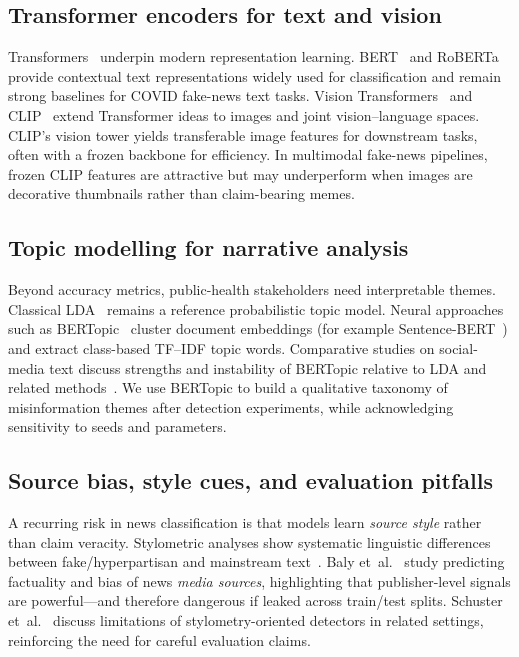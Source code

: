 \documentclass[12pt, a4paper]{report}
\begin{document}
\subsection{Transformer encoders for text and vision}

Transformers~\cite{vaswani2017attention} underpin modern representation learning.
BERT~\cite{devlin2019bert} and RoBERTa~\cite{liu2019roberta} provide contextual text representations widely used for classification and remain strong baselines for COVID fake-news text tasks.
Vision Transformers~\cite{dosovitskiy2021vit} and CLIP~\cite{radford2021clip} extend Transformer ideas to images and joint vision--language spaces.
CLIP's vision tower yields transferable image features for downstream tasks, often with a frozen backbone for efficiency.
In multimodal fake-news pipelines, frozen CLIP features are attractive but may underperform when images are decorative thumbnails rather than claim-bearing memes.

\subsection{Topic modelling for narrative analysis}

Beyond accuracy metrics, public-health stakeholders need interpretable themes.
Classical LDA~\cite{blei2003lda} remains a reference probabilistic topic model.
Neural approaches such as BERTopic~\cite{grootendorst2022bertopic} cluster document embeddings (for example Sentence-BERT~\cite{reimers2019sentence}) and extract class-based TF--IDF topic words.
Comparative studies on social-media text discuss strengths and instability of BERTopic relative to LDA and related methods~\cite{egger2022topic}.
We use BERTopic to build a qualitative taxonomy of misinformation themes after detection experiments, while acknowledging sensitivity to seeds and parameters.

\subsection{Source bias, style cues, and evaluation pitfalls}

A recurring risk in news classification is that models learn \emph{source style} rather than claim veracity.
Stylometric analyses show systematic linguistic differences between fake/hyperpartisan and mainstream text~\cite{horne2017just,potthast2018stylometric}.
Baly et~al.~\cite{baly2018predicting} study predicting factuality and bias of news \emph{media sources}, highlighting that publisher-level signals are powerful---and therefore dangerous if leaked across train/test splits.
Schuster et~al.~\cite{schuster2020limitations} discuss limitations of stylometry-oriented detectors in related settings, reinforcing the need for careful evaluation claims.
\end{document}
